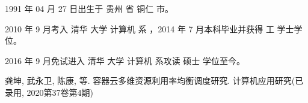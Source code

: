 \begin{resume}


 1991 年 04 月 27 日出生于 贵州 省 铜仁 市。

  2010 年 9 月考入 清华 大学 计算机 系 ，2014 年 7 月本科毕业并获得 工 学士学位。

  2016 年 9 月免试进入 清华 大学 计算机 系攻读 硕士 学位至今。


\begin{publications}
	\item 龚坤, 武永卫, 陈康, 等. 容器云多维资源利用率均衡调度研究. 计算机应用研究(已录用, 2020第37卷第4期)
\end{publications}

\end{resume}
